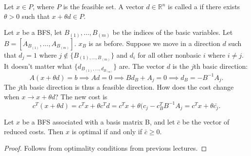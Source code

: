 \documentclass[a4paper]{scrartcl}
\begin{document}
\begin{definition}
	Let $x \in P$, where $P$ is the feasible set. A vector $d \in \mathbb{R}^{n} $ is called a  if there exists $\theta>0$ such that $x+\theta d \in P$.
\end{definition}

Let $x$ be a BFS, let $B_{(1)},\ldots ,B_{(m)}$ be the indices of the basic variables. Let $B=[A_{B_{(1)}},\ldots , A_{B_{(m)}}]$. $x_B$ is as before.
Suppose we move in a direction $d$ such that $d_j=1$ where $j \notin \{B_{(1),\ldots ,B_{(m)}}\}$ and $d_i$ for all other nonbasic $i$ where $i \neq j$. It doesn't matter what $\{d_{B_{(1)},\ldots ,d_{B_{(m)}}}\}$ are. The vector $d$ is the $j$th basic direction: 
\[A (x+\theta d)=b \implies Ad=0 \implies B d_B +A_j=0 \implies d_B= -{B}^{-1}A_j.\]
The $j$th basic direction is thus a feasible direction. How does the cost change when $x \to x+\theta d$? The new cost is 
\[c^T(x+\theta d)=c^Tx+\theta c^T d =c^Tx+\theta (c_j-c_B^T {B}^{-1}A_j=c^T x +\theta \bar{c_j}.\]
\begin{theorem}
	 Let $x$ be a BFS associated with a basis matrix B, and let $\bar{c}$ be the vector of reduced costs. Then $x$ is optimal if and only if $\bar{c} \geq 0$.
\end{theorem}
\begin{proof}
	 Follows from optimality conditions from previous lectures.
\end{proof}
\end{document}
